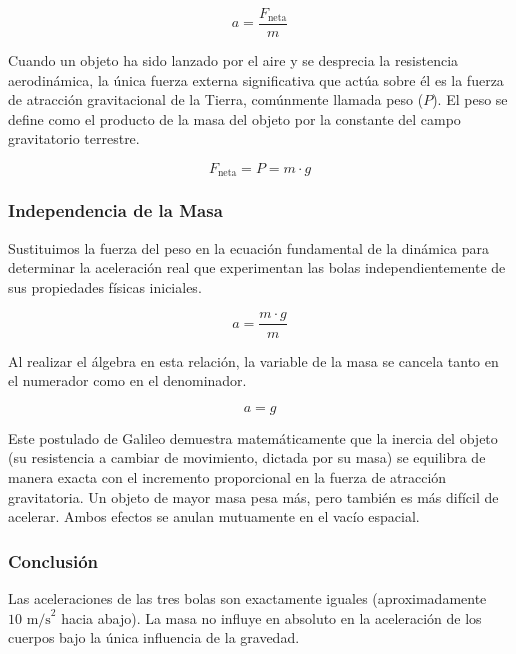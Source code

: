 \documentclass[12pt, a4paper]{article}
\begin{document}
\begin{equation}
a = \frac{F_{\text{neta}}}{m}
\end{equation}

Cuando un objeto ha sido lanzado por el aire y se desprecia la resistencia aerodinámica, la única fuerza externa significativa que actúa sobre él es la fuerza de atracción gravitacional de la Tierra, comúnmente llamada peso ($P$). El peso se define como el producto de la masa del objeto por la constante del campo gravitatorio terrestre.

\begin{equation}
F_{\text{neta}} = P = m \cdot g
\end{equation}

\subsubsection*{Independencia de la Masa}

Sustituimos la fuerza del peso en la ecuación fundamental de la dinámica para determinar la aceleración real que experimentan las bolas independientemente de sus propiedades físicas iniciales.

\begin{equation}
a = \frac{m \cdot g}{m}
\end{equation}

Al realizar el álgebra en esta relación, la variable de la masa se cancela tanto en el numerador como en el denominador.

\begin{equation}
a = g
\end{equation}

Este postulado de Galileo demuestra matemáticamente que la inercia del objeto (su resistencia a cambiar de movimiento, dictada por su masa) se equilibra de manera exacta con el incremento proporcional en la fuerza de atracción gravitatoria. Un objeto de mayor masa pesa más, pero también es más difícil de acelerar. Ambos efectos se anulan mutuamente en el vacío espacial.

\subsubsection*{Conclusión}

Las aceleraciones de las tres bolas son exactamente iguales (aproximadamente $10 \text{ m/s}^2$ hacia abajo). La masa no influye en absoluto en la aceleración de los cuerpos bajo la única influencia de la gravedad.
\end{document}
